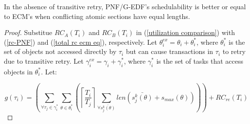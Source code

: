 \begin{clm}\label{PNF ecf comaprison clm}
In the absence of transitive retry, PNF/G-EDF's schedulability is better or equal to ECM's when conflicting atomic sections have equal lengths.
\end{clm}
\begin{proof}\normalfont
Substitue $RC_{A}(T_{i})$ and $RC_{B}(T_{i})$ in (\ref{utilization comparison})
with (\ref{rc-PNF}) and (\ref{total rc ecm eq}), respectively. Let $\theta_{i}^{ex}=\theta_{i}+\theta_{i}^{*}$, where $\theta_{i}^{*}$
is the set of objects not accessed directly by $\tau_{i}$ but can
cause transactions in $\tau_{i}$ to retry due to transitive retry.
Let $\gamma_{i}^{ex}=\gamma_{i}+\gamma_{i}^{*}$, where $\gamma_{i}^{*}$
is the set of tasks that access objects in $\theta_{i}^{*}$.
Let:
%

\begin{equation*}
g(\tau_{i}) = \left(\sum_{\forall\tau_{j}\in\gamma_{i}^{*}}\sum_{\theta\in\theta_{i}^{*}}\left(\left\lceil \frac{T_{i}}{T_{j}}\right\rceil \sum_{\forall\bar{s_{j}^{k}(\theta)}}len\left(\bar{s_{j}^{k}(\theta)} + s_{max}(\theta)\right)\right)\right)+RC_{re}(T_{i})
\end{equation*}


\end{proof}
